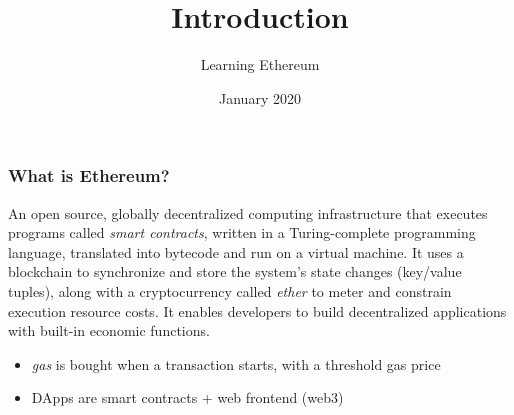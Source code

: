 \documentclass[11pt]{beamer}  %
\subtitle{Learning Ethereum}
\title{Introduction}
\institute{Universit\`a di Verona, Italy}
\date{January 2020}
\begin{document}
\begin{frame}
  \titlepage
\end{frame}

\begin{frame}
  \frametitle{What is Ethereum?}

  \begin{greenbox}{}
    An open source, globally decentralized computing infrastructure
    that executes programs called \emph{smart contracts}, written
    in a Turing-complete programming language, translated into
    bytecode and run on a virtual machine. It uses a
    blockchain to synchronize and store the system's state changes
    (key/value tuples), along
    with a cryptocurrency called \emph{ether} to meter and constrain
    execution resource costs. It enables developers to build
    decentralized applications with built-in economic functions.
  \end{greenbox}

  \begin{itemize}
  \item \emph{gas} is bought when a transaction starts, with a threshold
    gas price
  \item DApps are smart contracts + web frontend (web3)
  \end{itemize}
  
\end{frame}
\end{document}
